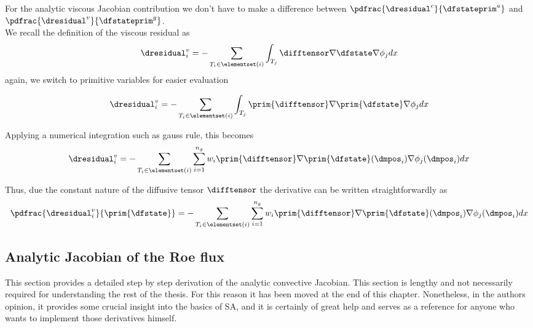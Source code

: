 \documentclass[../main.tex]{subfiles}
\begin{document}
For the analytic viscous Jacobian contribution we don't have to make a difference between $\pdfrac{\dresidual^c}{\dfstateprim^a}$ and $\pdfrac{\dresidual^v}{\dfstateprim^g}$.\\
We recall the definition of the viscous residual as
\begin{align}\label{eq:derivative_viscous_residual}
\dresidual_i^v=-\sum_{T_i \in \elementset(i)} \int_{T_j} \difftensor \nabla \dfstate \nabla \phi_j dx
\end{align}
again, we switch to primitive variables for easier evaluation

\begin{align}\label{eq:derivative_viscous_residual_primitives}
\dresidual_i^v=-\sum_{T_i \in \elementset(i)} \int_{T_j} \prim{\difftensor} \nabla \prim{\dfstate} \nabla \phi_j dx
\end{align}

Applying a numerical integration such as gauss rule, this becomes
\begin{align}\label{eq:aaa1}
\dresidual_i^v=-\sum_{T_i \in \elementset(i)} \sum_{i=1}^{n_g} 
w_i \prim{\difftensor} \nabla \prim{\dfstate}(\dmpos_i) \nabla \phi_j(\dmpos_i) dx
\end{align}

Thus, due the constant nature of the diffusive tensor $\difftensor$ the derivative can be written straightforwardly as
\begin{align}\label{eq:aaa2}
\pdfrac{\dresidual_i^v}{\prim{\dfstate}}=
-\sum_{T_i \in \elementset(i)} \sum_{i=1}^{n_g} 
w_i \prim{\difftensor} \nabla \prim{\dfstate}(\dmpos_i) \nabla \phi_j(\dmpos_i) dx
\end{align}




















\subsection{Analytic Jacobian of the Roe flux}\label{sec:jacobian_roeflux}

This section provides a detailed step by step derivation of the analytic convective Jacobian. This section is lengthy and not necessarily required for understanding the rest of the thesis. For this reason it has been moved at the end of this chapter. Nonetheless, in the authors opinion, it provides some crucial insight into the basics of \ac{SA}, and it is certainly of great help and serves as a reference for anyone who wants to implement those derivatives himself.\\
\end{document}
